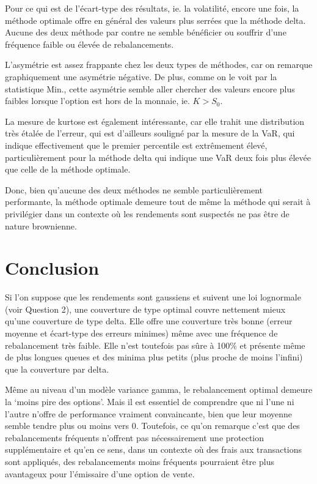 \documentclass[12pt,fleqn]{article}
\begin{document}
Pour ce qui est de l'écart-type des résultats, ie. la volatilité, encore une fois, la
méthode optimale offre en général des valeurs plus serrées que la méthode delta. Aucune
des deux méthode par contre ne semble bénéficier ou souffrir d'une fréquence faible ou
élevée de rebalancements. 

L'asymétrie est assez frappante chez les deux types de méthodes, car on remarque
graphiquement une asymétrie négative. De plus, comme on le voit par la statistique Min.,
cette asymétrie semble aller chercher des valeurs encore plus faibles lorsque l'option est
hors de la monnaie, ie. $K>S_0$. 

La mesure de kurtose est également intéressante, car elle trahit une distribution très
étalée de l'erreur, qui est d'ailleurs souligné par la mesure de la VaR, qui indique
effectivement que le premier percentile est extrêmement élevé, particulièrement pour la
méthode delta qui indique une VaR deux fois plus élevée que celle de la méthode optimale.

Donc, bien qu'aucune des deux méthodes ne semble particulièrement performante, la méthode
optimale demeure tout de même la méthode qui serait à privilégier dans un contexte où les
rendements sont suspectés ne pas être de nature brownienne. 


\section*{Conclusion}

Si l’on suppose que les rendements sont gaussiens et suivent une loi lognormale (voir
Question 2), une couverture de type optimal couvre nettement mieux qu’une couverture de
type delta. Elle offre une couverture très bonne (erreur moyenne et écart-type des erreurs
minimes) même avec une fréquence de rebalancement très faible. Elle n’est toutefois pas
sûre à 100\% et présente même de plus longues queues et des minima plus petits (plus
proche de moins l’infini) que la couverture par delta.

Même au niveau d'un modèle variance gamma, le rebalancement optimal demeure la `moins pire
des options'. Mais il est essentiel de comprendre que ni l'une ni l'autre n'offre de
performance vraiment convaincante, bien que leur moyenne semble tendre plus ou moins vers
0. Toutefois, ce qu'on remarque c'est que des rebalancements fréquents n'offrent pas
nécessairement une protection supplémentaire et qu'en ce sens, dans un contexte où des
frais aux transactions sont appliqués, des rebalancements moins fréquents pourraient être
plus avantageux pour l'émissaire d'une option de vente. 
\end{document}
